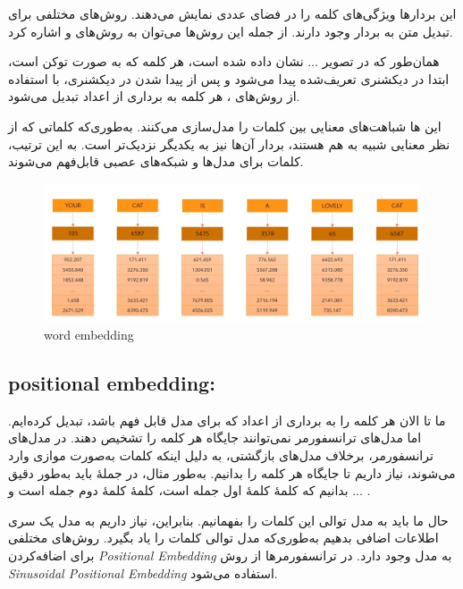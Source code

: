 این بردارها ویژگی‌های کلمه را در فضای عددی نمایش می‌دهند. روش‌های مختلفی برای تبدیل متن به بردار وجود دارند. از جمله این روش‌ها می‌توان به روش‌های  و  اشاره کرد.

همان‌طور که در تصویر ... نشان داده شده است، هر کلمه که به صورت توکن است، ابتدا در دیکشنری تعریف‌شده پیدا می‌شود و پس از پیدا شدن در دیکشنری، با استفاده از روش‌های ، هر کلمه به برداری از اعداد تبدیل می‌شود.

این ‌ها شباهت‌های معنایی بین کلمات را مدل‌سازی می‌کنند. به‌طوری‌که کلماتی که از نظر معنایی شبیه به هم هستند، بردار آن‌ها نیز به یکدیگر نزدیک‌تر است. به این ترتیب، کلمات برای مدل‌ها و شبکه‌های عصبی قابل‌فهم می‌شوند.




 \begin{figure}[h]
	\centering
	\begin{minipage}[b]{0.7\textwidth}
		\centering
		\includegraphics[width=\textwidth]{transformer_images/word_embedding.png}
		\caption{word embedding}
		\label{fig:word_embedding}
	\end{minipage}
	\hfill
	
\end{figure}



\subsection{positional embedding:}

ما تا الان هر کلمه را به برداری از اعداد که برای مدل قابل فهم باشد، تبدیل کرده‌ایم. اما مدل‌های ترانسفورمر نمی‌توانند جایگاه هر کلمه را تشخیص دهند. در مدل‌های ترانسفورمر، برخلاف مدل‌های بازگشتی، به دلیل اینکه کلمات به‌صورت موازی وارد می‌شوند، نیاز داریم تا جایگاه هر کلمه را بدانیم. به‌طور مثال، در جملهٔ  باید به‌طور دقیق بدانیم که کلمهٔ  کلمهٔ اول جمله است، کلمهٔ  کلمهٔ دوم جمله است و ... .

حال ما باید به مدل توالی این کلمات را بفهمانیم. بنابراین، نیاز داریم به مدل یک سری اطلاعات اضافی بدهیم به‌طوری‌که مدل توالی کلمات را یاد بگیرد. روش‌های مختلفی برای اضافه‌کردن \textit{Positional Embedding} به مدل وجود دارد. در ترانسفورمرها از روش \textit{Sinusoidal Positional Embedding} استفاده می‌شود. 


